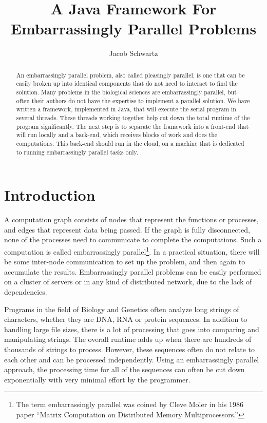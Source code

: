 \documentclass[12pt]{article}
\begin{document}
\title{A Java Framework For Embarrassingly Parallel Problems}
\author{Jacob Schwartz}
\maketitle

\begin{abstract}
An embarrassingly parallel problem, also called pleasingly parallel, is one that
can be easily broken up into identical components that do not need to interact
to find the solution. Many problems in the biological sciences are
embarrassingly parallel, but often their authors do not have the expertise to
implement a parallel solution. We have written a framework, implemented in Java,
that will execute the serial program in several threads. These threads working
together help cut down the total runtime of the program significantly. The next
step is to separate the framework into a front-end that will run locally and a
back-end, which receives blocks of work and does the computations. This back-end
should run in the cloud, on a machine that is dedicated to running
embarrassingly parallel tasks only.
\end{abstract}

\section{Introduction}

A computation graph consists of nodes that represent the functions or processes,
and edges that represent data being passed. If the graph is fully disconnected,
none of the processes need to communicate to complete the computations. Such a
computation is called embarrassingly parallel\footnote{The term embarrassingly
parallel was coined by Cleve Moler in his 1986 paper ``Matrix Computation on
Distributed Memory Multiprocessors.''}. In a practical situation, there will be
some inter-node communication to set up the problem, and then again to
accumulate the results.  Embarrassingly parallel problems can be easily
performed on a cluster of servers or in any kind of distributed network, due to
the lack of dependencies. 

Programs in the field of Biology and Genetics often analyze long strings of
characters, whether they are DNA, RNA or protein sequences. In addition to
handling large file sizes, there is a lot of processing that goes into comparing
and manipulating strings. The overall runtime adds up when there are hundreds of
thousands of strings to process. However, these sequences often do not relate to
each other and can be processed independently. Using an embarrassingly parallel
approach, the processing time for all of the sequences can often be cut down
exponentially with very minimal effort by the programmer.
\end{document}
